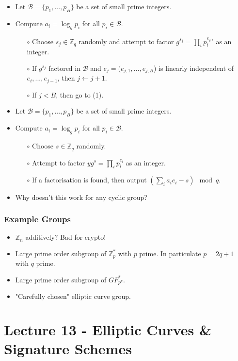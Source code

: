 \documentclass[a4paper]{scrartcl}
\begin{document}
\begin{itemize}
\item Let $\mathcal{B} = \{p_1, ..., p_B\}$ be a set of small prime integers.
\item Compute $a_i = \log_g p_i$ for all $p_i \in \mathcal{B}$.
\begin{itemize}
\item [$\circ$] Choose $s_j \in \mathbb{Z}_q$ randomly and attempt to factor $g^{s_j} = \prod_i p_i^{e_{j,i}}$ as an integer.
\item [$\circ$] If $g^{s_j}$ factored in $\mathcal{B}$ and $e_j = (e_{j,1}, ..., e_{j,B}$) is linearly independent of $e_i, ..., e_{j-1}$, then $j \gets j + 1$.
\item [$\circ$] If $j < B$, then go to (1).
\end{itemize}

\item Let $\mathcal{B} = \{p_1, ..., p_B\}$ be a set of small prime integers.
\item Compute $a_i = \log_g p_i$ for all $p_i \in \mathcal{B}$.
\begin{itemize}
\item [$\circ$] Choose $s \in \mathbb{Z}_q$ randomly.
\item [$\circ$] Attempt to factor $yg^s = \prod_i p_i^{e_i}$ as an integer.
\item [$\circ$] If a factorisation is found, then output $(\sum_i a_ie_i-s) \mod q$. 
\end{itemize}
\item Why doesn't this work for any cyclic group?
\end{itemize}

\subsubsection*{Example Groups}

\begin{itemize}
\item $\mathbb{Z}_n$ additively? Bad for crypto!
\item Large prime order subgroup of $\mathbb{Z}_p^*$ with $p$ prime. In particulate $p = 2q+1$ with $q$ prime.
\item Large prime order subgroup of $GF_{p^k}^*$.
\item "Carefully chosen" elliptic curve group.
\end{itemize}

\section*{Lecture 13 - Elliptic Curves \& Signature Schemes}
\end{document}

